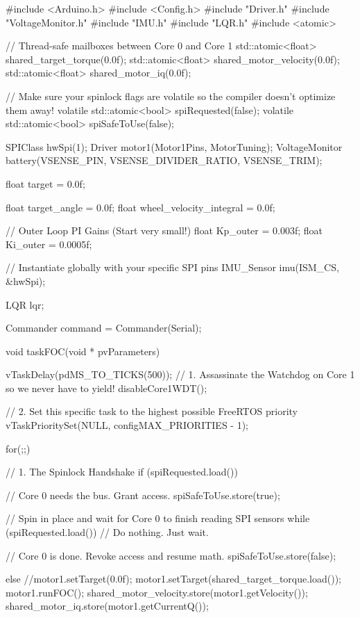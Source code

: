 #include <Arduino.h>
#include <Config.h>
#include "Driver.h"
#include "VoltageMonitor.h"
#include "IMU.h"
#include "LQR.h"
#include <atomic>


// Thread-safe mailboxes between Core 0 and Core 1
std::atomic<float> shared_target_torque(0.0f);
std::atomic<float> shared_motor_velocity(0.0f);
std::atomic<float> shared_motor_iq(0.0f);

// Make sure your spinlock flags are volatile so the compiler doesn't optimize them away!
volatile std::atomic<bool> spiRequested(false);
volatile std::atomic<bool> spiSafeToUse(false);

SPIClass hwSpi(1); 
Driver motor1(Motor1Pins, MotorTuning); 
VoltageMonitor battery(VSENSE_PIN, VSENSE_DIVIDER_RATIO, VSENSE_TRIM);

float target = 0.0f;

float target_angle = 0.0f;
float wheel_velocity_integral = 0.0f;

// Outer Loop PI Gains (Start very small!)
float Kp_outer = 0.003f; 
float Ki_outer = 0.0005f;

// Instantiate globally with your specific SPI pins
IMU_Sensor imu(ISM_CS, &hwSpi);

LQR lqr;

Commander command = Commander(Serial);

void taskFOC(void * pvParameters) {
    vTaskDelay(pdMS_TO_TICKS(500));
    // 1. Assassinate the Watchdog on Core 1 so we never have to yield!
    disableCore1WDT(); 

    // 2. Set this specific task to the highest possible FreeRTOS priority
    vTaskPrioritySet(NULL, configMAX_PRIORITIES - 1);

    for(;;) {
        // 1. The Spinlock Handshake
        if (spiRequested.load()) {
            // Core 0 needs the bus. Grant access.
            spiSafeToUse.store(true); 
            
            // Spin in place and wait for Core 0 to finish reading SPI sensors
            while (spiRequested.load()) { 
                // Do nothing. Just wait.
            }
            
            // Core 0 is done. Revoke access and resume math.
            spiSafeToUse.store(false); 
        } else {
            //motor1.setTarget(0.0f);
            motor1.setTarget(shared_target_torque.load());
            motor1.runFOC(); 
            shared_motor_velocity.store(motor1.getVelocity());
            shared_motor_iq.store(motor1.getCurrentQ());
        }
    }
}

